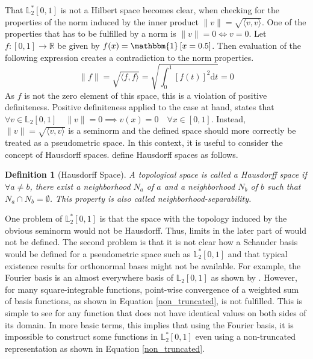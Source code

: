 \documentclass[12pt, a4paper]{article}
\theoremstyle{MAstyle} \newtheorem{assumption}{Assumption}[section]
\theoremstyle{MAstyle} \newtheorem{definition}{Definition}[section]
\theoremstyle{MAstyle} \newtheorem{theorem}{Theorem}[section]
\begin{document}
		That $\mathbb{L}^{*}_2[0,1]$ is not a Hilbert space becomes clear, when checking for the properties of the norm induced by the inner product $\| v \| = \sqrt{\langle v, v\rangle}$.
		One of the properties that has to be fulfilled by a norm is $\| v \| = 0 \Longleftrightarrow v = 0$.			
		Let $f:[0,1] \rightarrow \mathbb{R}$ be given by $f(x) = \mathbbm{1}\left[x = 0.5\right]$. Then evaluation of the following expression creates a contradiction to the norm properties.
		\begin{equation}
			\| f \| = \sqrt{\langle f, f\rangle} = \sqrt{\int_{0}^{1} \left[f(t)\right]^2\mathrm{d}t } = 0
		\end{equation}
		As $f$ is not the zero element of this space, this is a violation of positive definiteness. Positive definiteness applied to the case at hand, states that $\forall v \in \mathbb{L}_2[0,1] \quad \| v \| = 0 \implies v(x) = 0 \quad \forall x \in [0,1]$. Instead, $\| v \| = \sqrt{\langle v, v\rangle}$ is a seminorm and the defined space should more correctly be treated as a pseudometric space.
		In this context, it is useful to consider the concept of Hausdorff spaces. \cite{richmond_general_2020} define Hausdorff spaces as follows.
		\begin{definition}[Hausdorff Space]
			A topological space is called a Hausdorff space if $\forall a \neq b$, there exist a neighborhood $N_a$ of $a$ and a neighborhood $N_b$ of $b$ such that $N_a \cap N_b = \emptyset$. This property is also called neighborhood-separability.
		\end{definition}
		
		One problem of $\mathbb{L}^{*}_2[0,1]$ is that the space with the topology induced by the obvious seminorm would not be Hausdorff. Thus, limits in the later part of \cite{bugni_permutation_2021} would not be defined.
		The second problem is that it is not clear how a Schauder basis would be defined for a pseudometric space such as $\mathbb{L}^{*}_2[0,1]$ and that typical existence results for orthonormal bases might not be available.		
		For example, the Fourier basis is an almost everywhere basis of $\mathbb{L}_2[0,1]$ as shown by \cite{carleson_convergence_1966}. However, for many square-integrable functions, point-wise convergence of a weighted sum of basis functions, as shown in Equation \ref{non_truncated}, is not fulfilled. This is simple to see for any function that does not have identical values on both sides of its domain.
		In more basic terms, this implies that using the Fourier basis, it is impossible to construct some functions in $\mathbb{L}_2^{*}[0,1]$ even using a non-truncated representation as shown in Equation \ref{non_truncated}.
		
\end{document}
